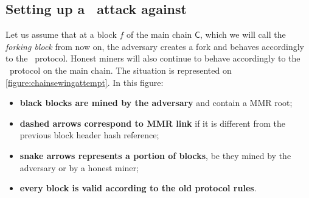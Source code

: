       \subsection{Setting up a \cs\ attack against \FC}
      
      Let us assume that at a block \(f\) of the main chain \(\mathsf{C}\), which we will call the \textit{forking block} from now on, the adversary creates a fork and behaves accordingly to the \FC\ protocol. Honest miners will also continue to behave accordingly to the \FC\ protocol on the main chain. The situation is represented on \autoref{figure:chainsewingattempt}. In this figure:
      
      \begin{itemize}
        \item \textbf{black blocks are mined by the adversary} and contain a MMR root;
        \item \textbf{dashed arrows correspond to MMR link} if it is different from the previous block header hash reference;
        \item \textbf{snake arrows represents a portion of blocks}, be they mined by the adversary or by a honest miner;
        \item \textbf{every block is valid according to the old protocol rules}.
      \end{itemize}
    
